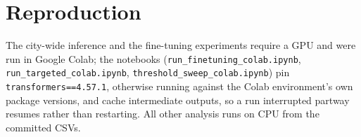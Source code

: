 \hypertarget{reproduction}{%
\section{Reproduction}\label{reproduction}}

The city-wide inference and the fine-tuning experiments require a GPU and were run in Google Colab; the notebooks (\texttt{run\_\allowbreak{}finetuning\_\allowbreak{}colab.\allowbreak{}ipynb}, \texttt{run\_\allowbreak{}targeted\_\allowbreak{}colab.\allowbreak{}ipynb}, \texttt{threshold\_\allowbreak{}sweep\_\allowbreak{}colab.\allowbreak{}ipynb}) pin \texttt{transformers==4.57.1}, otherwise running against the Colab environment's own package versions, and cache intermediate outputs, so a run interrupted partway resumes rather than restarting. All other analysis runs on CPU from the committed CSVs.
